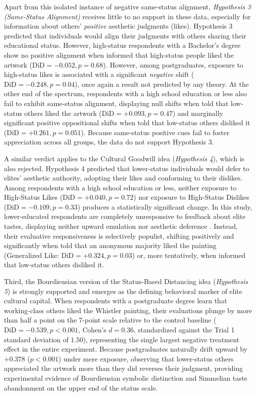 \documentclass[12pt, letterpaper]{article}
\begin{document}
Apart from this isolated instance of negative same-status alignment, \textit{Hypothesis 3 (Same-Status Alignment)} receives little to no support in these data, especially for information about others' \textit{positive} aesthetic judgments (likes). Hypothesis 3 predicted that individuals would align their judgments with others sharing their educational status. However, high-status respondents with a Bachelor's degree show no positive alignment when informed that high-status people liked the artwork ($\text{DiD} = -0.052, p = 0.68$). However, among postgraduates, exposure to high-status likes is associated with a significant \textit{negative} shift ($\text{DiD} = -0.248, p = 0.04$), once again a result not predicted by any theory.  At the other end of the spectrum, respondents with a high school education or less also fail to exhibit same-status alignment, displaying null shifts when told that low-status others liked the artwork ($\text{DiD} = +0.093, p = 0.47$) and marginally significant positive oppositional shifts when told that low-status others disliked it ($\text{DiD} = +0.261, p = 0.051$). Because same-status positive cues fail to foster appreciation across all groups, the data do not support Hypothesis 3.

A similar verdict applies to the Cultural Goodwill idea (\textit{Hypothesis 4}), which is also rejected. Hypothesis 4 predicted that lower-status individuals would defer to elites' aesthetic authority, adopting their likes and conforming to their dislikes. Among respondents with a high school education or less, neither exposure to High-Status Likes ($\text{DiD} = +0.040, p = 0.72$) nor exposure to High-Status Dislikes ($\text{DiD} = -0.109, p = 0.33$) produces a statistically significant change. In this study, lower-educated respondents are completely unresponsive to feedback about elite tastes, displaying neither upward emulation \citep{simmel1957} nor aesthetic deference \citep{bourdieu1984}. Instead, their evaluative responsiveness is selectively populist, shifting positively and significantly when told that an anonymous majority liked the painting (Generalized Like: $\text{DiD} = +0.324, p = 0.03$) or, more tentatively, when informed that low-status others disliked it.

Third, the Bourdieusian version of the Status-Based Distancing idea (\textit{Hypothesis 5}) is strongly supported and emerges as the defining behavioral marker of elite cultural capital. When respondents with a postgraduate degree learn that working-class others liked the Whistler painting, their evaluations plunge by more than half a point on the 7-point scale relative to the control baseline ($\text{DiD} = -0.539, p < 0.001$, Cohen's $d = 0.36$, standardized against the Trial 1 standard deviation of $1.50$), representing the single largest negative treatment effect in the entire experiment. Because postgraduates naturally drift upward by $+0.378$ ($p < 0.001$) under mere exposure, observing that lower-status others appreciated the artwork more than they did reverses their judgment, providing experimental evidence of Bourdieusian symbolic distinction and Simmelian taste abandonment on the upper end of the status scale. 
\end{document}
